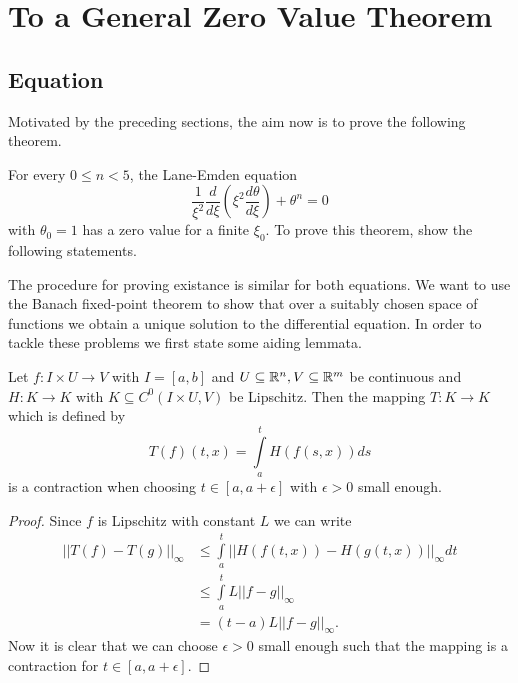 \section{To a General Zero Value Theorem}
\subsection{\texorpdfstring{}{LE} Equation}
Motivated by the preceding sections, the aim now is to prove the following theorem.
\begin{theorem}
	\label{5-Zeroes-The-Lane-EmdenFiniteBoundary}
	For every $0\leq n<5$, the Lane-Emden equation
	\begin{equation}
		\frac{1}{\xi^2}\frac{d}{d\xi}\left(\xi^2\frac{d\theta}{d\xi}\right)+\theta^n=0
		\label{5-Zeroes-Equ-LEeq}
	\end{equation}
	with $\theta_0=1$ has a zero value for a finite $\xi_0$. To prove this theorem, show the following statements.
\end{theorem}\noindent
The procedure for proving existance is similar for both equations.
We want to use the Banach fixed-point theorem to show that over a suitably chosen space of functions we obtain a unique solution to the differential equation.
In order to tackle these problems we first state some aiding lemmata.
\begin{lemma}
	\label{5-Zeroes-Lem-Integral-Contraction}
	Let $f:I\times U\rightarrow V$ with $I=[a,b]$ and $U\subseteq\mathbb{R}^n,V\subseteq\mathbb{R}^m$ be continuous and $H:K\rightarrow K$ with $K\subseteq C^0(I\times U,V)$ be Lipschitz.
	Then the mapping $T:K\rightarrow K$ which is defined by
	\begin{equation}
		T(f)(t,x)=\int\limits_a^tH(f(s,x))ds
	\end{equation}
	is a contraction when choosing $t\in[a,a+\epsilon]$ with $\epsilon>0$ small enough.
\end{lemma}
\begin{proof}
	Since $f$ is Lipschitz with constant $L$ we can write
	\begin{align}
		||T(f)-T(g)||_\infty 	&\leq \int\limits_a^t||H(f(t,x))-H(g(t,x))||_\infty dt\\
								&\leq \int\limits_a^tL||f-g||_\infty\\
								&=(t-a)L||f-g||_\infty.
	\end{align}
	Now it is clear that we can choose $\epsilon>0$ small enough such that the mapping is a contraction for $t\in[a,a+\epsilon]$.
\end{proof}
